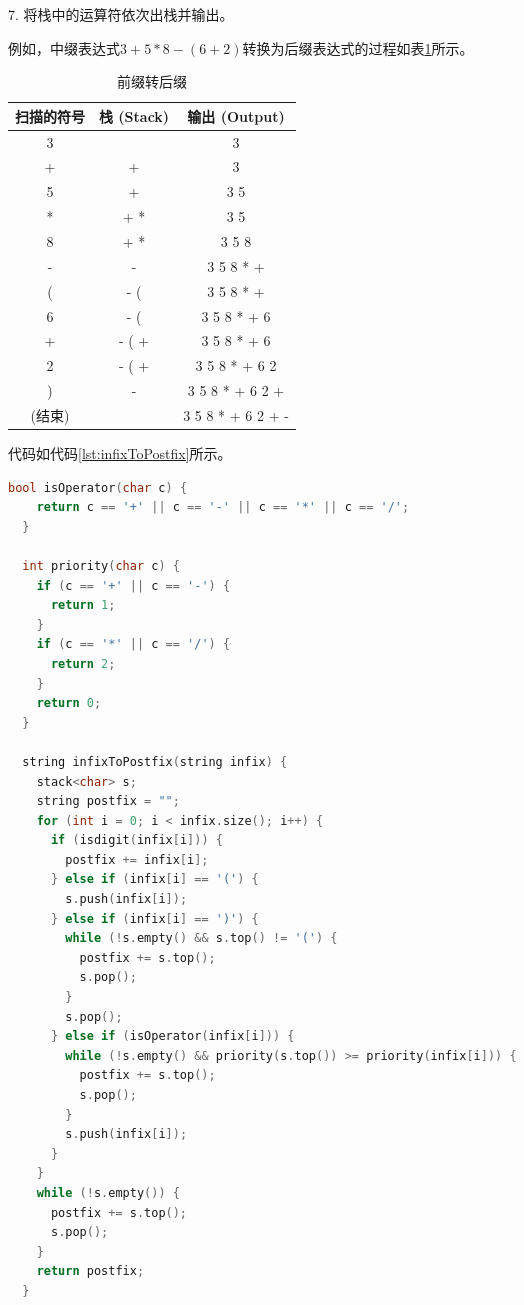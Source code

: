 \documentclass[lang=cn,newtx,10pt,scheme=chinese]{../elegantbook}
\begin{document}
7. 将栈中的运算符依次出栈并输出。

例如，中缀表达式$3+5*8-(6 + 2)$转换为后缀表达式的过程如表\ref{tab:infixToPostfix}所示。


\begin{table}[h!]
  \centering
  \begin{tabular}{|c|c|c|}
  \hline
  \textbf{扫描的符号} & \textbf{栈 (Stack)} & \textbf{输出 (Output)} \\ \hline
  3 &  & 3 \\ \hline
  + & + & 3 \\ \hline
  5 & + & 3 5 \\ \hline
  * & + * & 3 5 \\ \hline
  8 & + * & 3 5 8 \\ \hline
  - & - & 3 5 8 * + \\ \hline
  ( & - ( & 3 5 8 * + \\ \hline
  6 & - ( & 3 5 8 * + 6 \\ \hline
  + & - ( + & 3 5 8 * + 6 \\ \hline
  2 & - ( + & 3 5 8 * + 6 2 \\ \hline
  ) & - & 3 5 8 * + 6 2 + \\ \hline
  (结束) &  & 3 5 8 * + 6 2 + - \\ \hline
  \end{tabular}
  \caption{前缀转后缀}
  \label{tab:infixToPostfix}
  \end{table}

代码如代码\ref{lst:infixToPostfix}所示。

\begin{lstlisting}[language=C++, caption={中缀表达式转后缀表达式示例代码}, label={lst:infixToPostfix}]
  bool isOperator(char c) {
    return c == '+' || c == '-' || c == '*' || c == '/';
  }

  int priority(char c) {
    if (c == '+' || c == '-') {
      return 1;
    }
    if (c == '*' || c == '/') {
      return 2;
    }
    return 0;
  }

  string infixToPostfix(string infix) {
    stack<char> s;
    string postfix = "";
    for (int i = 0; i < infix.size(); i++) {
      if (isdigit(infix[i])) {
        postfix += infix[i];
      } else if (infix[i] == '(') {
        s.push(infix[i]);
      } else if (infix[i] == ')') {
        while (!s.empty() && s.top() != '(') {
          postfix += s.top();
          s.pop();
        }
        s.pop();
      } else if (isOperator(infix[i])) {
        while (!s.empty() && priority(s.top()) >= priority(infix[i])) {
          postfix += s.top();
          s.pop();
        }
        s.push(infix[i]);
      }
    }
    while (!s.empty()) {
      postfix += s.top();
      s.pop();
    }
    return postfix;
  }

\end{lstlisting}
\end{document}
